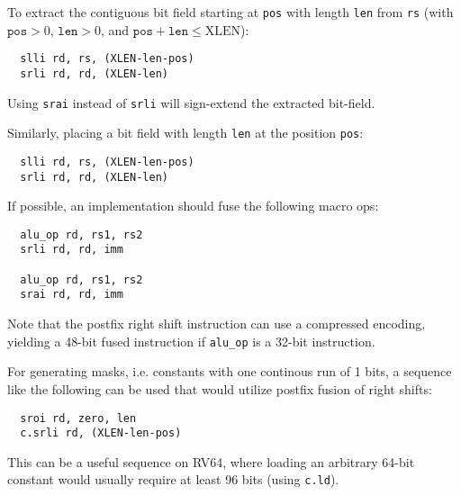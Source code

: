 To extract the contiguous bit field starting at {\tt pos} with length {\tt len}
from {\tt rs} (with $\texttt{pos}>0$, $\texttt{len}>0$, and
$\texttt{pos}+\texttt{len}\le\textrm{XLEN}$):

\begin{minipage}{\linewidth}
\begin{verbatim}
  slli rd, rs, (XLEN-len-pos)
  srli rd, rd, (XLEN-len)
\end{verbatim}
\end{minipage}

Using \texttt{srai} instead of \texttt{srli} will sign-extend the extracted bit-field.

Similarly, placing a bit field with length {\tt len} at the position {\tt pos}:

\begin{minipage}{\linewidth}
\begin{verbatim}
  slli rd, rs, (XLEN-len-pos)
  srli rd, rd, (XLEN-len)
\end{verbatim}
\end{minipage}

If possible, an implementation should fuse the following macro ops:

\begin{minipage}{\linewidth}
\begin{verbatim}
  alu_op rd, rs1, rs2
  srli rd, rd, imm

  alu_op rd, rs1, rs2
  srai rd, rd, imm
\end{verbatim}
\end{minipage}

Note that the postfix right shift instruction can use a compressed encoding,
yielding a 48-bit fused instruction if {\tt alu\_op} is a 32-bit instruction.

For generating masks, i.e. constants with one continous run of 1 bits, a sequence
like the following can be used that would utilize postfix fusion of right shifts:

\begin{minipage}{\linewidth}
\begin{verbatim}
  sroi rd, zero, len
  c.srli rd, (XLEN-len-pos)
\end{verbatim}
\end{minipage}

This can be a useful sequence on RV64, where loading an arbitrary 64-bit constant would usually
require at least 96 bits (using \texttt{c.ld}).


